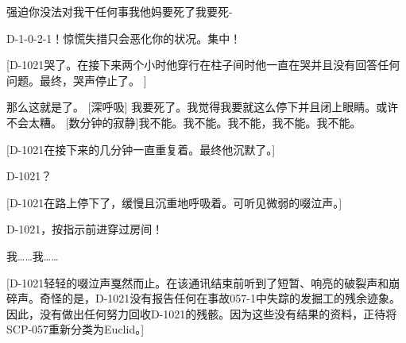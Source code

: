 \begin{scpbox}
强迫你没法对我干任何事我他妈要死了我要死-

D-1-0-2-1！惊慌失措只会恶化你的状况。集中！

{[}D-1021哭了。在接下来两个小时他穿行在柱子间时他一直在哭并且没有回答任何问题。最终，哭声停止了。 ]

那么这就是了。 {[}深呼吸] 我要死了。我觉得我要就这么停下并且闭上眼睛。或许不会太糟。 {[}数分钟的寂静]我不能。我不能。我不能，我不能。我不能。

{[}D-1021在接下来的几分钟一直重复着。最终他沉默了。]

D-1021？

{[}D-1021在路上停下了，缓慢且沉重地呼吸着。可听见微弱的啜泣声。]

D-1021，按指示前进穿过房间！

我……我……

{[}D-1021轻轻的啜泣声戛然而止。在该通讯结束前听到了短暂、响亮的破裂声和崩碎声。奇怪的是，D-1021没有报告任何在事故057-1中失踪的发掘工的残余迹象。因此，没有做出任何努力回收D-1021的残骸。因为这些没有结果的资料，正待将SCP-057重新分类为Euclid。]

\end{scpbox}
